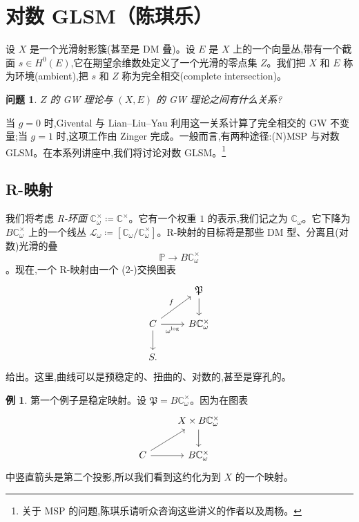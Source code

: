 \documentclass{amsart}
\newtheorem{quest}[thm]{问题}
\theoremstyle{definition}
\newtheorem{exm}[thm]{例}
\theoremstyle{remark}
\theoremstyle{plain}
\theoremstyle{definition}
\theoremstyle{remark}
\newcommand{\C}{\mathbb{C}}
\renewcommand{\P}{\mathbb{P}}
\newcommand{\mc}[1]{\mathcal{#1}}
\newcommand{\mf}[1]{\mathfrak{#1}}
\newcommand{\1}{\mathbf{1}}
\newcommand{\2}{\mathbf{2}}
\newcommand{\3}{\mathbf{3}}
\begin{document}
\section{对数 GLSM（陈琪乐）}%
\label{sec:Log GLSM (Qile Chen)}

设 \(X\) 是一个光滑射影簇(甚至是 DM 叠)。设 \(E\) 是 \(X\) 上的一个向量丛,带有一个截面 \(s \in H^0(E)\),它在期望余维数处定义了一个光滑的零点集 \(Z\)。我们把 \(X\) 和 \(E\) 称为环境(ambient),把 \(s\) 和 \(Z\) 称为完全相交(complete intersection)。

\begin{quest}
    \(Z\) 的 GW 理论与 \((X, E)\) 的 GW 理论之间有什么关系?
\end{quest}

当 \(g = 0\) 时,Givental 与 Lian–Liu–Yau 利用这一关系计算了完全相交的 GW 不变量;当 \(g = 1\) 时,这项工作由 Zinger 完成。一般而言,有两种途径:(N)MSP 与对数 GLSM。在本系列讲座中,我们将讨论对数 GLSM。\footnote{关于 MSP 的问题,陈琪乐请听众咨询这些讲义的作者以及周杨。}

\subsection{R-映射}%
\label{sub:R-maps}

我们将考虑 \textit{R-环面} \(\C^{\times}_{\omega} \coloneqq \C^{\times}\)。它有一个权重 \(1\) 的表示,我们记之为 \(\C_{\omega}\)。它下降为 \(B \C_{\omega}^{\times}\) 上的一个线丛 \(\mc{L}_{\omega} \coloneqq [\C_{\omega} / \C^{\times}_{\omega}]\)。R-映射的目标将是那些 DM 型、分离且(对数)光滑的叠
\[ \P \to B \C^{\times}_{\omega} \]
。现在,一个 R-映射由一个 (2-)交换图表
\begin{equation*}
\begin{tikzcd}
    & \mf{P} \ar{d} \\
    C \ar{ur}{f} \ar{r}[swap]{\omega^{\log}} \ar{d} & B \C_{\omega}^{\times} \\
    S.
\end{tikzcd}
\end{equation*}
给出。这里,曲线可以是预稳定的、扭曲的、对数的,甚至是穿孔的。

\begin{exm}
    第一个例子是稳定映射。设 \(\mf{P} = B\C_{\omega}^{\times}\)。因为在图表
    \begin{equation*}
    \begin{tikzcd}
        & X \times B\C_{\omega}^{\times} \ar{d} \\
        C \ar{ur} \ar{r} & B \C_{\omega}^{\times}
    \end{tikzcd}
    \end{equation*}
    中竖直箭头是第二个投影,所以我们看到这约化为到 \(X\) 的一个映射。
\end{exm}
\end{document}
